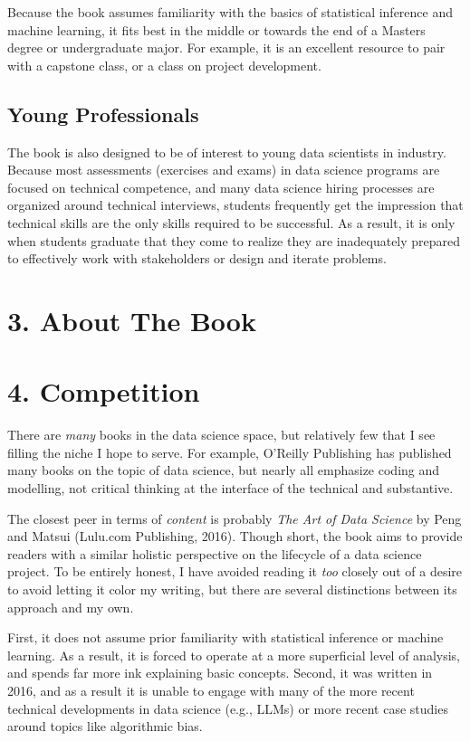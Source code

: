 \documentclass[12pt]{article}
\begin{document}
Because the book assumes familiarity with the basics of statistical
inference and machine learning, it fits best in the middle or towards
the end of a Masters degree or undergraduate major. For example, it is
an excellent resource to pair with a capstone class, or a class on
project development.

\subsection*{Young Professionals}\label{young-professionals}

The book is also designed to be of interest to young data scientists in
industry. Because most assessments (exercises and exams) in data science
programs are focused on technical competence, and many data science
hiring processes are organized around technical interviews, students
frequently get the impression that technical skills are the only skills
required to be successful. As a result, it is only when students
graduate that they come to realize they are inadequately prepared to
effectively work with stakeholders or design and iterate problems.

\section*{3. About The Book}\label{about-the-book}

\section*{4. Competition}\label{competition}

There are \emph{many} books in the data science space, but relatively
few that I see filling the niche I hope to serve. For example, O'Reilly
Publishing has published many books on the topic of data science, but
nearly all emphasize coding and modelling, not critical thinking at the
interface of the technical and substantive.

The closest peer in terms of \emph{content} is probably \emph{The Art of
Data Science} by Peng and Matsui (Lulu.com Publishing, 2016). Though
short, the book aims to provide readers with a similar holistic
perspective on the lifecycle of a data science project. To be entirely
honest, I have avoided reading it \emph{too} closely out of a desire to
avoid letting it color my writing, but there are several distinctions
between its approach and my own.

First, it does not assume prior familiarity with statistical inference
or machine learning. As a result, it is forced to operate at a more
superficial level of analysis, and spends far more ink explaining basic
concepts. Second, it was written in 2016, and as a result it is unable
to engage with many of the more recent technical developments in data
science (e.g., LLMs) or more recent case studies around topics like
algorithmic bias.
\end{document}
